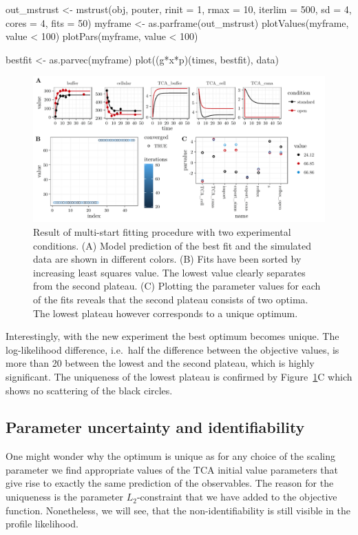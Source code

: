 \documentclass[article]{jss}
\begin{document}
\begin{CodeChunk}
\begin{CodeInput}
out_mstrust <- mstrust(obj, pouter, rinit = 1, rmax = 10, iterlim = 500,
		       sd = 4,
		       cores = 4, fits = 50)
myframe <- as.parframe(out_mstrust)
plotValues(myframe, value < 100)
plotPars(myframe, value < 100)

bestfit <- as.parvec(myframe)
plot((g*x*p)(times, bestfit), data)
\end{CodeInput}
\end{CodeChunk}
\begin{figure}[ht]
	\centering
	\includegraphics[width = \textwidth]{images/figure6}
	\caption{Result of multi-start fitting procedure with two experimental conditions. (A) Model prediction of the best fit and the simulated data are shown in different colors. (B) Fits have been sorted by increasing least squares value. The lowest value clearly separates from the second plateau. (C) Plotting the parameter values for each of the fits reveals that the second plateau consists of two optima. The lowest plateau however corresponds to a unique optimum.}
	\label{fig:twoconditions}
\end{figure}

Interestingly, with the new experiment the best optimum becomes unique. The log-likelihood difference, i.e.~half the difference between the objective values, is more than 20 between the lowest and the second plateau, which is highly significant. The uniqueness of the lowest plateau is confirmed by Figure~\ref{fig:twoconditions}C which shows no scattering of the black circles.

\subsection{Parameter uncertainty and identifiability}

One might wonder why the optimum is unique as for any choice of the scaling parameter  we find appropriate values of the TCA initial value parameters that give rise to exactly the same prediction of the observables. The reason for the uniqueness is the parameter $L_2$-constraint that we have added to the objective function. Nonetheless, we will see, that the non-identifiability is still visible in the profile likelihood.
\end{document}
